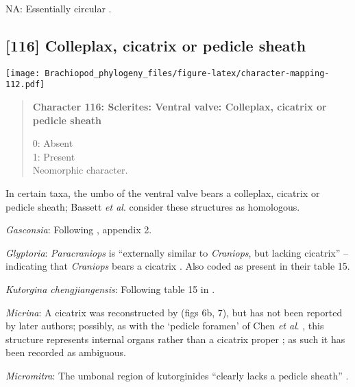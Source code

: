 \documentclass[openany]{book}
\theoremstyle{definition}
\theoremstyle{definition}
\theoremstyle{definition}
\theoremstyle{remark}
\begin{document}
\hypertarget{NA-coding-115}{}
NA: Essentially circular \citep[fig. 4]{Holmer2009Theenigmatic}.

\subsection*{{[}116{]} Colleplax, cicatrix or pedicle
sheath}\label{colleplax-cicatrix-or-pedicle-sheath}

\texttt{[image: Brachiopod\_phylogeny\_files/figure-latex/character-mapping-112.pdf]}

\begin{quote}
\textbf{Character 116: Sclerites: Ventral valve: Colleplax, cicatrix or
pedicle sheath}

0: Absent\\
1: Present\\
Neomorphic character.
\end{quote}

In certain taxa, the umbo of the ventral valve bears a colleplax,
cicatrix or pedicle sheath; Bassett \emph{et al}.
\citeyearpar{Bassett2008Earlyontogeny} consider these structures as
homologous.

\hypertarget{Gasconsia-coding-116}{}
\emph{Gasconsia}: Following \citet{Williams1998Thediversity}, appendix
2.

\hypertarget{Glyptoria-coding-116}{}
\emph{Glyptoria}: \emph{Paracraniops} is ``externally similar to
\emph{Craniops}, but lacking cicatrix'' -- indicating that
\emph{Craniops} bears a cicatrix
\citep{Williams2000LinguliformeaCraniiformea}. Also coded as present in
their table 15.

\hypertarget{Kutorgina_chengjiangensis-coding-116}{}
\emph{Kutorgina chengjiangensis}: Following table 15 in
\citet{Williams2000LinguliformeaCraniiformea}.

\hypertarget{Micrina-coding-116}{}
\emph{Micrina}: A cicatrix was reconstructed by
\citet{Jin1992Revisionof} (figs 6b, 7), but has not been reported by
later authors; possibly, as with the `pedicle foramen' of Chen \emph{et
al}. \citeyearpar{Chen2007Reinterpretationof}, this structure represents
internal organs rather than a cicatrix proper
\citep{Zhang2009Architectureand}; as such it has been recorded as
ambiguous.

\hypertarget{Micromitra-coding-116}{}
\emph{Micromitra}: The umbonal region of kutorginides ``clearly lacks a
pedicle sheath'' \citep{Holmer2018Theattachment}.
\end{document}
